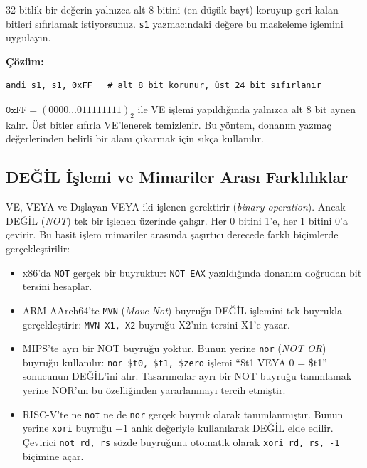 \begin{ornek}[3.12]
32 bitlik bir değerin yalnızca alt 8 bitini (en düşük bayt) koruyup geri kalan bitleri sıfırlamak istiyorsunuz. \texttt{s1} yazmacındaki değere bu maskeleme işlemini uygulayın.

\textbf{Çözüm:}
\begin{lstlisting}[style=riscv]
andi s1, s1, 0xFF   # alt 8 bit korunur, üst 24 bit sıfırlanır
\end{lstlisting}

$\texttt{0xFF} = (0000\ldots011111111)_2$ ile VE işlemi yapıldığında yalnızca alt 8 bit aynen kalır. Üst bitler sıfırla VE'lenerek temizlenir. Bu yöntem, donanım yazmaç değerlerinden belirli bir alanı çıkarmak için sıkça kullanılır.
\end{ornek}

\subsection{DEĞİL İşlemi ve Mimariler Arası Farklılıklar}
\label{sec:degil-islemi}

VE, VEYA ve Dışlayan VEYA iki işlenen gerektirir (\emph{binary operation}). Ancak DEĞİL (\textit{NOT}) tek bir işlenen üzerinde çalışır. Her 0 bitini 1'e, her 1 bitini 0'a çevirir. Bu basit işlem mimariler arasında şaşırtıcı derecede farklı biçimlerde gerçekleştirilir:

\begin{itemize}[nosep]
\item x86'da \texttt{NOT} gerçek bir buyruktur: \texttt{NOT EAX} yazıldığında donanım doğrudan bit tersini hesaplar.
\item ARM AArch64'te \texttt{MVN} (\emph{Move Not}) buyruğu DEĞİL işlemini tek buyrukla gerçekleştirir: \texttt{MVN X1, X2} buyruğu X2'nin tersini X1'e yazar.
\item MIPS'te ayrı bir NOT buyruğu yoktur. Bunun yerine \texttt{nor} (\emph{NOT OR}) buyruğu kullanılır: \texttt{nor \$t0, \$t1, \$zero} işlemi ``\$t1 VEYA 0 = \$t1'' sonucunun DEĞİL'ini alır. Tasarımcılar ayrı bir NOT buyruğu tanımlamak yerine NOR'un bu özelliğinden yararlanmayı tercih etmiştir.
\item RISC-V'te ne \texttt{not} ne de \texttt{nor} gerçek buyruk olarak tanımlanmıştır. Bunun yerine \texttt{xori} buyruğu $-1$ anlık değeriyle kullanılarak DEĞİL elde edilir. Çevirici \texttt{not rd, rs} sözde buyruğunu otomatik olarak \texttt{xori rd, rs, -1} biçimine açar.
\end{itemize}

